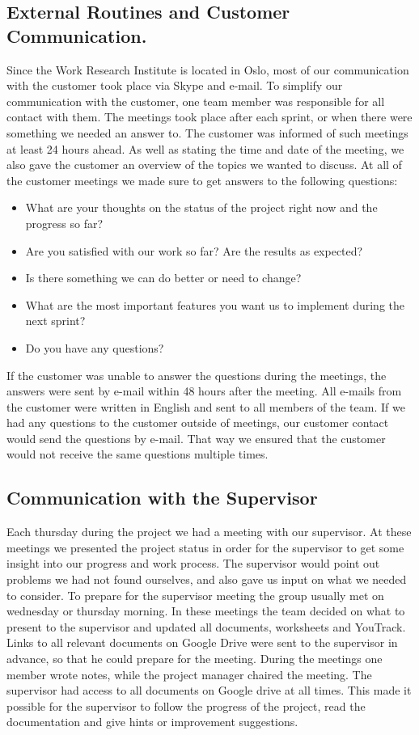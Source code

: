\subsection{External Routines and Customer Communication.}
\label{subsec:PlanningQualityExternal}
Since the Work Research Institute is located in Oslo, most of our communication with the customer took place via Skype and e-mail. To simplify our communication with the customer, one team member was responsible for all contact with them. The meetings took place after each sprint, or when there were something we needed an answer to. The customer was informed of such meetings at least 24 hours ahead. As well as stating the time and date of the meeting, we also gave the customer an overview of the topics we wanted to discuss. At all of the customer meetings we made sure to get answers to the following questions:
\begin{itemize}
\item What are your thoughts on the status of the project right now and the progress so far?
\item Are you satisfied with our work so far? Are the results as expected?
\item Is there something we can do better or need to change?
\item What are the most important features you want us to implement during the next sprint?
\item Do you have any questions?
\end{itemize}
If the customer was unable to answer the questions during the meetings, the answers were sent by e-mail within 48 hours after the meeting. All e-mails from the customer were written in English and sent to all members of the team. If we had any questions to the customer outside of meetings, our customer contact would send the questions by e-mail. That way we ensured that the customer would not receive the same questions multiple times.

\subsection{Communication with the Supervisor}
\label{subsec:PlanningQualityAdvisor}
Each thursday during the project we had a meeting with our supervisor. At these meetings we presented the project status in order for the supervisor to get some insight into our progress and work process. The supervisor would point out problems we had not found ourselves, and also gave us input on what we needed to consider. To prepare for the supervisor meeting the group usually met on wednesday or thursday morning. In these meetings the team decided on what to present to the supervisor and updated all documents, worksheets and YouTrack. Links to all relevant documents on Google Drive were sent to the supervisor in advance, so that he could prepare for the meeting. During the meetings one member wrote notes, while the project manager chaired the meeting. The supervisor had access to all documents on Google drive at all times. This made it possible for the supervisor to follow the progress of the project, read the documentation and give hints or improvement suggestions.

